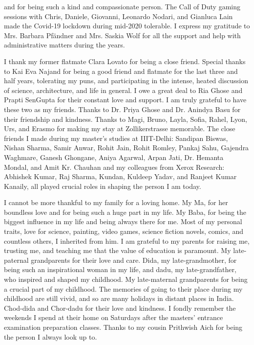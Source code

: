 and for being such a kind and compassionate person. The Call of Duty gaming sessions with Chris, Daniele, Giovanni, Leonardo Nodari, and Gianluca Lain made the Covid-19 lockdown during mid-2020 tolerable. I express my gratitude to Mrs. Barbara Pf\"andner and Mrs. Saskia Wolf for all the support and help with administrative matters during the years.


I thank my former flatmate Clara Lovato for being a close friend. Special thanks to Kai Eva Najand for being a good friend and flatmate for the last three and half years, tolerating my puns, and participating in the intense, heated discussion of science, architecture, and life in general. I owe a great deal to Ria Ghose and Prapti SenGupta for their constant love and support. I am truly grateful to have these two as my friends. Thanks to Dr. Priya Ghose and Dr. Anindya Basu for their friendship and kindness. Thanks to Magi, Bruno, Layla, Sofia, Rahel, Lyon, Urs, and Erasmo for making my stay at Zollikerstrasse memorable. The close friends I made during my master's studies at IIIT-Delhi: Sandipan Biswas, Nishan Sharma, Samir Anwar, Rohit Jain, Rohit Romley, Pankaj Sahu, Gajendra Waghmare, Ganesh Ghongane, Aniya Agarwal, Arpan Jati, Dr. Hemanta Mondal, and Amit Kr. Chauhan and my colleagues from Xerox Research: Abhishek Kumar, Raj Sharma, Kundan, Kuldeep Yadav, and Ranjeet Kumar Kanaily, all played crucial roles in shaping the person I am today.


I cannot be more thankful to my family for a loving home. My Ma, for her boundless love and for being such a huge part in my life. My Baba, for being the biggest influence in my life and being always there for me. Most of my personal traits, love for science, painting, video games, science fiction novels, comics, and countless others, I inherited from him. I am grateful to my parents for raising me, trusting me, and teaching me that the value of education is paramount. My late-paternal grandparents for their love and care. Dida, my late-grandmother, for being such an inspirational woman in my life, and dadu, my late-grandfather, who inspired and shaped my childhood. My late-maternal grandparents for being a crucial part of my childhood. The memories of going to their place during my childhood are still vivid, and so are many holidays in distant places in India. Chod-dida and Chor-dadu for their love and kindness. I fondly remember the weekends I spend at their home on Saturdays after the masters' entrance examination preparation classes. Thanks to my cousin Prithwish Aich for being the person I always look up to.

